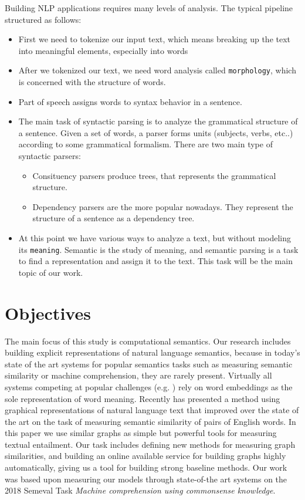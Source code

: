 Building NLP applications requires many levels of analysis.
The typical pipeline structured as follows:
\begin{itemize}
	\item First we need to tokenize our input text, which means breaking up the text into meaningful elements, especially into words
	\item After we tokenized our text, we need word analysis called \texttt{morphology}, which is concerned with the structure of words.
	\item Part of speech assigns words to syntax behavior in a sentence.
	\item The main task of syntactic parsing is to analyze the grammatical structure of a sentence. Given a set of words, a parser forms units (subjects, verbs, etc..) according to some grammatical formalism.
	There are two main type of syntactic parsers:
	\begin{itemize}
		\item Consituency parsers produce trees, that represents the grammatical structure.
		\item Dependency parsers are the more popular nowadays. They represent the structure of a sentence as a dependency tree.
	\end{itemize}
	\item At this point we have various ways to analyze a text, but without modeling its \texttt{meaning}. Semantic is the study of meaning, and semantic parsing is a task to find a representation and assign it to the text. This task will be the main topic of our work.
\end{itemize}
\section{Objectives}
The main focus of this study is computational semantics. Our research includes building explicit representations of natural language semantics, because in today's state of the art systems for popular semantics tasks such as measuring semantic similarity or machine comprehension, they are rarely present. Virtually all systems
competing at popular challenges (e.g. \cite{Cer:2017,Collados:2017}) rely on word embeddings as the sole representation of word meaning. Recently \cite{Recski:2016c} has presented a method using graphical representations of natural language text that improved over the state of the art on the task of
measuring semantic similarity of pairs of English words. In this paper
we use similar graphs as simple but powerful tools for measuring textual
entailment. Our task includes defining new methods for measuring graph similarities, and building an online available service for building graphs highly automatically, giving us a tool for building strong baseline methods. Our work was based upon measuring our models through state-of-the art systems on the 2018 Semeval Task \textit{Machine comprehension using commonsense knowledge}.

